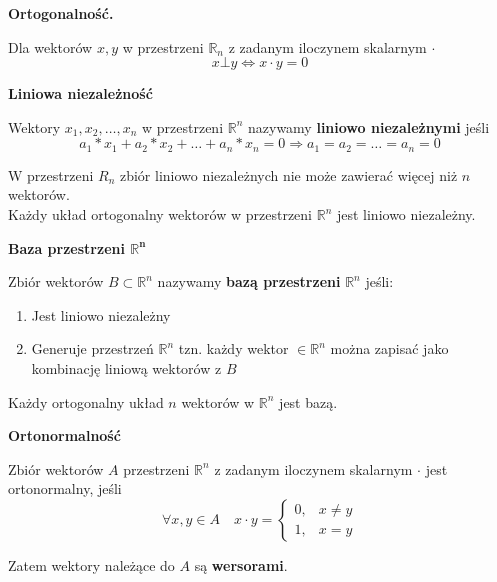 \documentclass[main.tex]{subfiles}
\begin{document}
    \begin{definition}
        \textbf{Ortogonalność.}

        Dla wektorów $x, y$ w przestrzeni $\mathbb{R}_n$ z zadanym iloczynem skalarnym $\cdot$
        \[x \bot y \Leftrightarrow x \cdot y = 0 \]

    \end{definition}

    \begin{definition}
        \textbf{Liniowa niezależność}

        Wektory $x_1, x_2 ,\dots, x_n$ w przestrzeni $\mathbb{R}^n$ nazywamy \textbf{liniowo niezależnymi} jeśli
        \[a_1 * x_1 + a_2 * x_2 + \ldots + a_n * x_n = 0 \Rightarrow a_1 = a_2 = \ldots = a_n = 0\]

        W przestrzeni $R_n$ zbiór liniowo niezależnych nie może zawierać więcej niż $n$ wektorów.\\
        Każdy układ ortogonalny wektorów w przestrzeni $\mathbb{R}^n$ jest liniowo niezależny.

    \end{definition}

    \begin{definition}

        \textbf{Baza przestrzeni $\mathbf{\mathbb{R}^n}$}

        Zbiór wektorów $B \subset \mathbb{R}^n$ nazywamy \textbf{bazą przestrzeni} $\mathbb{R}^n$ jeśli:

        \begin{enumerate}
            \item Jest liniowo niezależny
            \item Generuje przestrzeń $\mathbb{R}^n$ tzn. każdy wektor $\in \mathbb{R}^n$ można zapisać jako kombinację liniową wektorów z $B$
        \end{enumerate}

        Każdy ortogonalny układ $n$ wektorów w $\mathbb{R}^n$ jest bazą.
    \end{definition}

    \begin{definition}
        \textbf{Ortonormalność}

        Zbiór wektorów $A$ przestrzeni $\mathbb{R}^n$ z zadanym iloczynem skalarnym $\cdot$ jest ortonormalny, jeśli
        \[ \forall x,y \in A  \quad   x \cdot y =  \begin{cases}
                                                       0, & x \ne y \\
                                                       1, & x = y
        \end{cases}\]

        Zatem wektory należące do $A$ są \textbf{wersorami}.
    \end{definition}
\end{document}
